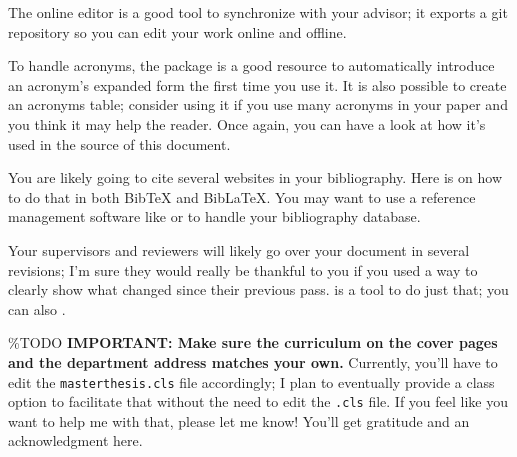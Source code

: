 The  online editor is a good
tool to synchronize with your advisor; it exports a git repository so
you can edit your work online and offline.

To handle acronyms, the
 package is a
good resource to automatically introduce an acronym's expanded form the
first time you use it. It is also possible to create an acronyms table;
consider using it if you use many acronyms in your paper and you think
it may help the reader. Once again, you can have a look at how it's used
in the source of this document.

You are likely going to cite several websites in your bibliography. Here
is
on how to do that in both BibTeX and BibLaTeX. You may want to use a
reference management software like
 or
 to handle your bibliography
database.

Your supervisors and reviewers will likely go over your document in
several revisions; I'm sure they would really be thankful to you if you
used a way to clearly show what changed since their previous pass.
 is a tool to do just
that; you can also
.

\%TODO
\textbf{IMPORTANT: Make sure the curriculum on the cover pages and the department address matches your own.}
Currently, you'll have to edit the \texttt{masterthesis.cls} file
accordingly; I plan to eventually provide a class option to facilitate
that without the need to edit the \texttt{.cls} file. If you feel like
you want to help me with that, please let me know! You'll get gratitude
and an acknowledgment here.
